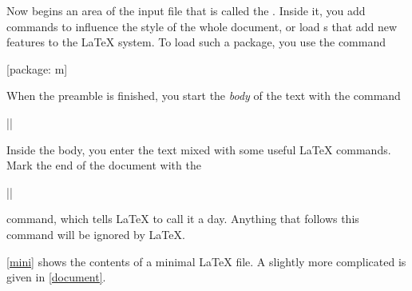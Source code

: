 Now begins an area of the input file that is called the \emph{}.
Inside it, you add commands to influence the style of the whole document, or
load s that add new features to the \LaTeX{} system. To load such a
package, you use the command
\begin{code}
  [package: m]
\end{code}

When the preamble is finished, you start the \emph{body} of the text with the
command
\begin{code}
  \ltx||
\end{code}

Inside the body, you enter the text mixed with some useful \LaTeX{} commands.
Mark the end of the document with the
\begin{code}
  \ltx||
\end{code}
command, which tells \LaTeX{} to call it a day. Anything that
follows this command will be ignored by \LaTeX.

\autoref{mini} shows the contents of a minimal \LaTeX{} file. A
slightly more complicated  is given in
\autoref{document}.

\begin{listing}
  \begin{lined}{10cm}
  \end{lined}
  \caption{A Minimal \LaTeX{} File.}\label{mini}
\end{listing}

